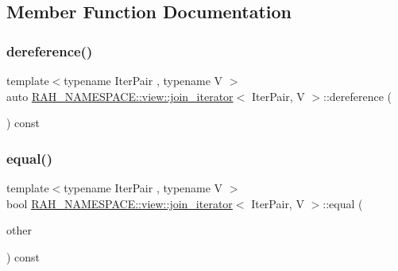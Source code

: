 \subsection{Member Function Documentation}
\mbox{\label{struct_r_a_h___n_a_m_e_s_p_a_c_e_1_1view_1_1join__iterator_a767b00208ccd127dc728c35defc526f0}} 
\subsubsection{\texorpdfstring{dereference()}{dereference()}}
{\footnotesize\ttfamily template$<$typename Iter\+Pair , typename V $>$ \\
auto \mbox{\hyperlink{struct_r_a_h___n_a_m_e_s_p_a_c_e_1_1view_1_1join__iterator}{R\+A\+H\+\_\+\+N\+A\+M\+E\+S\+P\+A\+C\+E\+::view\+::join\+\_\+iterator}}$<$ Iter\+Pair, V $>$\+::dereference (\begin{DoxyParamCaption}{ }\end{DoxyParamCaption}) const\hspace{0.3cm}{\ttfamily [inline]}}

\mbox{\label{struct_r_a_h___n_a_m_e_s_p_a_c_e_1_1view_1_1join__iterator_a92db3de2df175d2514d72b2ea027c930}} 
\subsubsection{\texorpdfstring{equal()}{equal()}}
{\footnotesize\ttfamily template$<$typename Iter\+Pair , typename V $>$ \\
bool \mbox{\hyperlink{struct_r_a_h___n_a_m_e_s_p_a_c_e_1_1view_1_1join__iterator}{R\+A\+H\+\_\+\+N\+A\+M\+E\+S\+P\+A\+C\+E\+::view\+::join\+\_\+iterator}}$<$ Iter\+Pair, V $>$\+::equal (\begin{DoxyParamCaption}\item[{\mbox{\hyperlink{struct_r_a_h___n_a_m_e_s_p_a_c_e_1_1view_1_1join__iterator}{join\+\_\+iterator}}$<$ Iter\+Pair, V $>$}]{other }\end{DoxyParamCaption}) const\hspace{0.3cm}{\ttfamily [inline]}}

